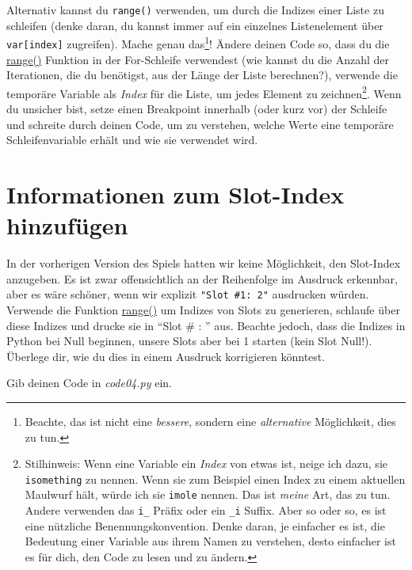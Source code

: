 \documentclass[
]{book}
\begin{document}
Alternativ kannst du \texttt{range()} verwenden, um durch die Indizes einer Liste zu schleifen (denke daran, du kannst immer auf ein einzelnes Listenelement über \texttt{var{[}index{]}} zugreifen). Mache genau das\footnote{Beachte, das ist nicht eine \emph{bessere}, sondern eine \emph{alternative} Möglichkeit, dies zu tun.}! Ändere deinen Code so, dass du die \href{(https://docs.python.org/3/library/stdtypes.html\#range)}{range()} Funktion in der For-Schleife verwendest (wie kannst du die Anzahl der Iterationen, die du benötigst, aus der Länge der Liste berechnen?), verwende die temporäre Variable als \emph{Index} für die Liste, um jedes Element zu zeichnen\footnote{Stilhinweis: Wenn eine Variable ein \emph{Index} von etwas ist, neige ich dazu, sie \texttt{isomething} zu nennen. Wenn sie zum Beispiel einen Index zu einem aktuellen Maulwurf hält, würde ich sie \texttt{imole} nennen. Das ist \emph{meine} Art, das zu tun. Andere verwenden das \texttt{i\_} Präfix oder ein \texttt{\_i} Suffix. Aber so oder so, es ist eine nützliche Benennungskonvention. Denke daran, je einfacher es ist, die Bedeutung einer Variable aus ihrem Namen zu verstehen, desto einfacher ist es für dich, den Code zu lesen und zu ändern.}. Wenn du unsicher bist, setze einen Breakpoint innerhalb (oder kurz vor) der Schleife und schreite durch deinen Code, um zu verstehen, welche Werte eine temporäre Schleifenvariable erhält und wie sie verwendet wird.

\hypertarget{informationen-zum-slot-index-hinzufuxfcgen}{%
\section{Informationen zum Slot-Index hinzufügen}\label{informationen-zum-slot-index-hinzufuxfcgen}}

In der vorherigen Version des Spiels hatten wir keine Möglichkeit, den Slot-Index anzugeben. Es ist zwar offensichtlich an der Reihenfolge im Ausdruck erkennbar, aber es wäre schöner, wenn wir explizit \texttt{"Slot\ \#1:\ 2"} ausdrucken würden. Verwende die Funktion \href{https://docs.python.org/3/tutorial/controlflow.html?highlight=loop\#the-range-function}{range()} um Indizes von Slots zu generieren, schlaufe über diese Indizes und drucke sie in ``Slot \# : '' aus. Beachte jedoch, dass die Indizes in Python bei Null beginnen, unsere Slots aber bei 1 starten (kein Slot Null!). Überlege dir, wie du dies in einem Ausdruck korrigieren könntest.

Gib deinen Code in \emph{code04.py} ein.
\end{document}
